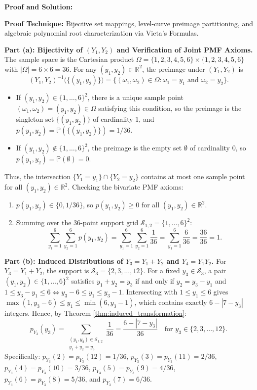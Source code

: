 \documentclass[11pt, letterpaper]{article}
\theoremstyle{definition}
\theoremstyle{remark}
\newcommand{\R}{\mathbb{R}}
\newcommand{\Prob}{\mathbb{P}}
\begin{document}
\textbf{Proof and Solution:}

\textbf{Proof Technique:} Bijective set mappings, level-curve preimage partitioning, and algebraic polynomial root characterization via Vieta's Formulas.

\textbf{Part (a): Bijectivity of $(Y_1, Y_2)$ and Verification of Joint PMF Axioms.}
The sample space is the Cartesian product $\Omega = \{1, 2, 3, 4, 5, 6\} \times \{1, 2, 3, 4, 5, 6\}$ with $|\Omega| = 6 \times 6 = 36$. For any $(y_1, y_2) \in \R^2$, the preimage under $(Y_1, Y_2)$ is
\[
(Y_1, Y_2)^{-1}\bigl(\{(y_1, y_2)\}\bigr) = \bigl\{(\omega_1, \omega_2) \in \Omega : \omega_1 = y_1 \text{ and } \omega_2 = y_2\bigr\}.
\]
\begin{itemize}
    \item If $(y_1, y_2) \in \{1, \dots, 6\}^2$, there is a unique sample point $(\omega_1, \omega_2) = (y_1, y_2) \in \Omega$ satisfying this condition, so the preimage is the singleton set $\{(y_1, y_2)\}$ of cardinality 1, and $p(y_1, y_2) = \Prob(\{(y_1, y_2)\}) = 1/36$.
    \item If $(y_1, y_2) \notin \{1, \dots, 6\}^2$, the preimage is the empty set $\emptyset$ of cardinality 0, so $p(y_1, y_2) = \Prob(\emptyset) = 0$.
\end{itemize}
Thus, the intersection $\{Y_1 = y_1\} \cap \{Y_2 = y_2\}$ contains at most one sample point for all $(y_1, y_2) \in \R^2$. Checking the bivariate PMF axioms:
\begin{enumerate}[label=\textbf{(A\arabic*)}]
    \item $p(y_1, y_2) \in \{0, 1/36\}$, so $p(y_1, y_2) \ge 0$ for all $(y_1, y_2) \in \R^2$.
    \item Summing over the 36-point support grid $\mathcal{S}_{1,2} = \{1, \dots, 6\}^2$:
    \[
    \sum_{y_1 = 1}^{6} \sum_{y_2 = 1}^{6} p(y_1, y_2) = \sum_{y_1 = 1}^{6} \sum_{y_2 = 1}^{6} \frac{1}{36} = \sum_{y_1 = 1}^{6} \frac{6}{36} = \frac{36}{36} = 1.
    \]
\end{enumerate}

\textbf{Part (b): Induced Distributions of $Y_3 = Y_1 + Y_2$ and $Y_4 = Y_1 Y_2$.}
For $Y_3 = Y_1 + Y_2$, the support is $\mathcal{S}_3 = \{2, 3, \dots, 12\}$. For a fixed $y_3 \in \mathcal{S}_3$, a pair $(y_1, y_2) \in \{1, \dots, 6\}^2$ satisfies $y_1 + y_2 = y_3$ if and only if $y_2 = y_3 - y_1$ and $1 \le y_3 - y_1 \le 6 \iff y_3 - 6 \le y_1 \le y_3 - 1$. Intersecting with $1 \le y_1 \le 6$ gives $\max(1, y_3 - 6) \le y_1 \le \min(6, y_3 - 1)$, which contains exactly $6 - |7 - y_3|$ integers. Hence, by Theorem \ref{thm:induced_transformation}:
\[
p_{Y_3}(y_3) = \sum_{\substack{(y_1, y_2) \in \mathcal{S}_{1,2} \\ y_1 + y_2 = y_3}} \frac{1}{36} = \frac{6 - |7 - y_3|}{36} \quad \text{for } y_3 \in \{2, 3, \dots, 12\}.
\]
Specifically: $p_{Y_3}(2) = p_{Y_3}(12) = 1/36$, $p_{Y_3}(3) = p_{Y_3}(11) = 2/36$, $p_{Y_3}(4) = p_{Y_3}(10) = 3/36$, $p_{Y_3}(5) = p_{Y_3}(9) = 4/36$, $p_{Y_3}(6) = p_{Y_3}(8) = 5/36$, and $p_{Y_3}(7) = 6/36$.
\end{document}
